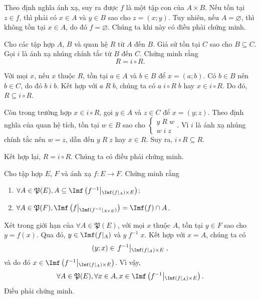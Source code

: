 Theo định nghĩa ánh xạ, suy ra được $f$ là một tập con của $A \times B$. Nếu tồn tại $z \in f$, thì phải có $x \in A$ và $y \in B$ sao cho $z = (x; y)$. Tuy nhiên, nếu $A = \varnothing$, thì không tồn tại $x \in A$, do đó $f = \varnothing$. Chúng ta khi này có điều phải chứng minh.

\exercise Cho các tập hợp $A$, $B$ và quan hệ $R$ từ $A$ đến $B$. Giả sử tồn tại $C$ sao cho $B \subseteq C$. Gọi $i$ là ánh xạ nhúng chính tắc từ $B$ đến $C$. Chứng minh rằng
\begin{equation*}
   R = i \circ R.
\end{equation*}

\solution

Với mọi $x$, nếu $x$ thuộc $R$, tồn tại $a \in A$ và $b \in B$ để $x = (a; b)$. Có $b \in B$ nên $b \in C$, do đó $b\;i\;b$. Kết hợp với $a\;R\;b$, chúng ta có $a\;i\circ R\;b$ hay $x \in i \circ R$. Do đó, $R \subseteq i \circ R$.

Còn trong trường hợp $x \in i \circ R$, gọi $y \in A$ và $z \in C$ để $x = (y; z)$. Theo định nghĩa của quan hệ tích, tồn tại $w \in B$ sao cho $\begin{cases}
   y\;R\;w \\
   w\;i\;z
\end{cases}$. Vì $i$ là ánh xạ nhúng chính tắc nên $w = z$, dẫn đến $y\;R\;z$ hay $x \in R$. Suy ra, $i \circ R \subseteq R$.

Kết hợp lại, $R = i \circ R$. Chúng ta có điều phải chứng minh.


\exercise Cho tập hợp $E$, $F$ và ánh xạ $f: E \to F$. Chứng minh rằng
\begin{enumerate}
   \item $\forall A \in \mathfrak{P}(E), A \subseteq \Imf\left(f^{-1}\middle|_{\Imf(f|_A) \times E}\right)$;
   \item $\forall A \in \mathfrak{P}(F), \Imf\left(f\middle|_{\Imf\left(f^{-1}\middle|_{A \times E}\right)}\right) = \Imf(f) \cap A$.
\end{enumerate}

\solution

\resetSubexercise Xét trong giới hạn của $\forall A \in \mathfrak{P}(E)$, với mọi $x$ thuộc $A$, tồn tại $y \in F$ sao cho $y = f(x)$. Qua đó, $y \in \Imf(f|_A)$ và $y\;f^{-1}\;x$. Kết hợp với $x = A$, chúng ta có \begin{equation*}
   (y; x) \in \left.f^{-1}\middle|_{\Imf(f|_A) \times E}\right.,
\end{equation*} 
và do đó $x \in \Imf\left(f^{-1}\middle|_{\Imf(f|_A) \times E}\right)$. Vì vậy, $$
\forall A \in \mathfrak{P}(E), \forall x \in A, x \in \Imf\left(f^{-1}\middle|_{\Imf(f|_A) \times E}\right).$$
Điều phải chứng minh.

